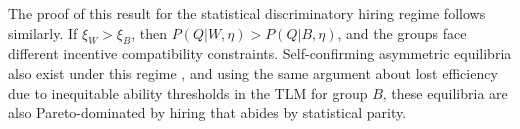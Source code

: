 \documentclass[sigconf]{acmart}
\theoremstyle{definition}
\begin{document}
The proof of this result for the statistical discriminatory hiring regime follows similarly. If $\xi_W > \xi_B$, then $P(Q | W, \eta) > P(Q | B, \eta)$, and the groups face different incentive compatibility constraints. Self-confirming asymmetric equilibria also exist under this regime \cite{coate1993will}, and using the same argument about lost efficiency due to inequitable ability thresholds in the TLM for group $B$, these equilibria are also Pareto-dominated by hiring that abides by statistical parity. 



\balance

\end{document}
